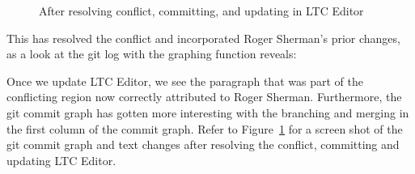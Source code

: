 \begin{figure}
\centering
{}
\caption{After resolving conflict, committing, and updating in LTC Editor} \label{fig:editor-merge-resolve}
\end{figure}
This has resolved the conflict and incorporated Roger Sherman's prior changes, as a look at the git log with the graphing function reveals:
Once we update LTC Editor, we see the paragraph that was part of the conflicting region now correctly attributed to Roger Sherman.  Furthermore, the git commit graph has gotten more interesting with the branching and merging in the first column of the commit graph.  Refer to Figure~\ref{fig:editor-merge-resolve} for a screen shot of the git commit graph and text changes after resolving the conflict, committing and updating LTC Editor.
